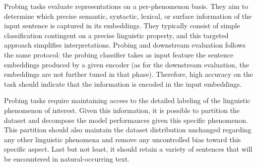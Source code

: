 



Probing tasks evaluate representations on a per-phenomenon basis. They aim to determine which precise semantic, syntactic, lexical, or surface information of the input sentence is captured in its embeddings. They typically consist of simple classification contingent on a precise linguistic property, and this targeted approach simplifies interpretations. Probing and downstream evaluation follows the same protocol: the probing classifier takes as input feature the sentence embeddings produced by a given encoder (as for the downstream evaluation, the embeddings are not further tuned in that phase). Therefore, high accuracy on the task should indicate that the information is encoded in the input embeddings.

Probing tasks require maintaining access to the detailed labeling of the linguistic phenomenon of interest. Given this information, it is possible to partition the dataset and decompose the model performances given this specific phenomenon. This partition should also maintain the dataset distribution unchanged regarding any other linguistic phenomena and remove any uncontrolled bias toward this specific aspect. Last but not least, it should retain a variety of sentences that will be encountered in natural-occurring text.

